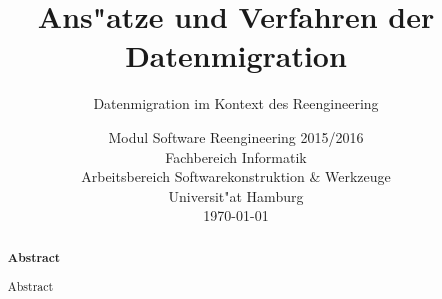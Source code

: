 \documentclass[11pt]{scrartcl}
\begin{document}
	
\title{Ans"atze und Verfahren der Datenmigration}

\subtitle{Datenmigration im Kontext des Reengineering} 


\date{Modul Software Reengineering 2015/2016\\
  \small Fachbereich Informatik\\ 
  Arbeitsbereich Softwarekonstruktion \& Werkzeuge\\ 
  Universit"at Hamburg\\[4mm]
  \today}

\maketitle

\begin{abstract}
	\small\noindent\textbf{Abstract}

	\noindent Abstract 
\end{abstract}

\newpage
\tableofcontents
\newpage









\newpage



\end{document}
